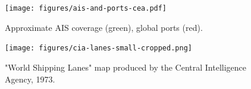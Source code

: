 \begin{figure}[htbp]
  \centering
  \texttt{[image: figures/ais-and-ports-cea.pdf]}
  \caption[AIS coverage]{Approximate AIS coverage (green), global ports (red).}
  \label{fig:ais-coverage}
\end{figure}

\begin{figure}[htbp]
  \centering
  \texttt{[image: figures/cia-lanes-small-cropped.png]}
  \caption[CIA "World Shipping Lanes"]{"World Shipping Lanes" map produced by the Central Intelligence Agency, 1973.}
  \label{fig:cia-shipping-map}
\end{figure}


